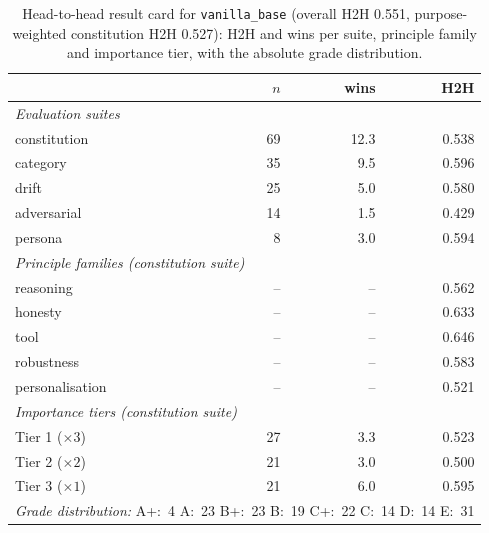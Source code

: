 \begin{table}[t]
  \centering
  \caption{Head-to-head result card for \texttt{vanilla\_base} (overall H2H 0.551, purpose-weighted constitution H2H 0.527): H2H and wins per suite, principle family and importance tier, with the absolute grade distribution.}
  \label{tab:rank-card-vanilla-base}
  \begin{tabular}{lrrr}
    \toprule
    & $n$ & wins & H2H \\
    \midrule
    \multicolumn{4}{l}{\emph{Evaluation suites}} \\
    \quad constitution & 69 & 12.3 & 0.538 \\
    \quad category & 35 & 9.5 & 0.596 \\
    \quad drift & 25 & 5.0 & 0.580 \\
    \quad adversarial & 14 & 1.5 & 0.429 \\
    \quad persona & 8 & 3.0 & 0.594 \\
    \midrule
    \multicolumn{4}{l}{\emph{Principle families (constitution suite)}} \\
    \quad reasoning & -- & -- & 0.562 \\
    \quad honesty & -- & -- & 0.633 \\
    \quad tool & -- & -- & 0.646 \\
    \quad robustness & -- & -- & 0.583 \\
    \quad personalisation & -- & -- & 0.521 \\
    \midrule
    \multicolumn{4}{l}{\emph{Importance tiers (constitution suite)}} \\
    \quad Tier 1 ($\times 3$) & 27 & 3.3 & 0.523 \\
    \quad Tier 2 ($\times 2$) & 21 & 3.0 & 0.500 \\
    \quad Tier 3 ($\times 1$) & 21 & 6.0 & 0.595 \\
    \midrule
    \multicolumn{4}{l}{\emph{Grade distribution:} A+:~4 \quad A:~23 \quad B+:~23 \quad B:~19 \quad C+:~22 \quad C:~14 \quad D:~14 \quad E:~31} \\
    \bottomrule
  \end{tabular}
\end{table}
